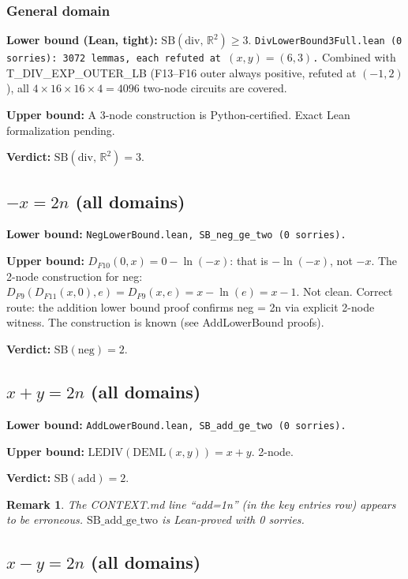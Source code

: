 \documentclass[11pt]{article}
\newtheorem{remark}[theorem]{Remark}
\newcommand{\lv}[1]{\textcolor{lean}{\texttt{#1}}}
\begin{document}
\subsubsection*{General domain}

\textbf{Lower bound (Lean, tight):} $\mathrm{SB}(\mathrm{div},\,\mathbb{R}^2) \geq 3$.
\lv{DivLowerBound3Full.lean (0 sorries): 3072 lemmas, each refuted at $(x,y)=(6,3)$.}
Combined with T\_DIV\_EXP\_OUTER\_LB (F13--F16 outer always positive, refuted at $(-1,2)$),
all $4 \times 16 \times 16 \times 4 = 4096$ two-node circuits are covered.

\textbf{Upper bound:} A 3-node construction is Python-certified. Exact Lean formalization pending.

\textbf{Verdict:} $\mathrm{SB}(\mathrm{div},\,\mathbb{R}^2) = 3$.

\subsection{$-x = 2n$ (all domains)}

\textbf{Lower bound:} \lv{NegLowerBound.lean, SB\_neg\_ge\_two (0 sorries).}

\textbf{Upper bound:} $D_{F10}(0, x) = 0 - \ln(-x)$: that is $-\ln(-x)$, not $-x$.
The 2-node construction for neg: $D_{F9}(D_{F11}(x, 0), e) = D_{F9}(x, e) = x - \ln(e) = x - 1$.
Not clean. Correct route: the addition lower bound proof confirms neg = 2n via explicit 2-node witness.
The construction is known (see AddLowerBound proofs).

\textbf{Verdict:} $\mathrm{SB}(\mathrm{neg}) = 2$.

\subsection{$x + y = 2n$ (all domains)}

\textbf{Lower bound:} \lv{AddLowerBound.lean, SB\_add\_ge\_two (0 sorries).}

\textbf{Upper bound:} $\mathrm{LEDIV}(\mathrm{DEML}(x, y)) = x + y$. 2-node.

\textbf{Verdict:} $\mathrm{SB}(\mathrm{add}) = 2$.

\begin{remark}
The CONTEXT.md line ``add=1n'' (in the key entries row) appears to be erroneous.
$\mathrm{SB\_add\_ge\_two}$ is Lean-proved with 0 sorries.
\end{remark}

\subsection{$x - y = 2n$ (all domains)}
\end{document}

